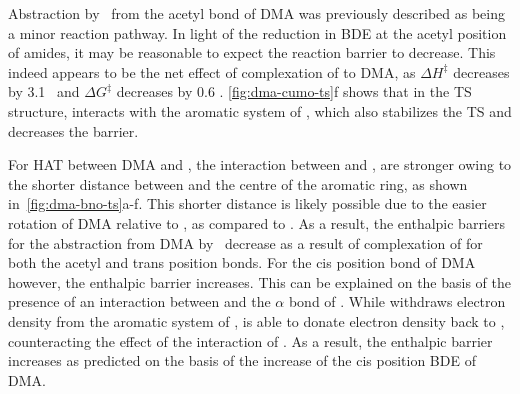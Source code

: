 Abstraction by \cumo\ from the acetyl  bond of DMA was previously
described as being a minor reaction pathway.\cite{Salamone2013} In light of the
reduction in BDE at the acetyl position of amides, it may be reasonable to
expect the reaction barrier to decrease. This indeed appears to be the net
effect of complexation of  to DMA, as $\Delta H^\ddagger$ decreases by
3.1 \kcalmol\ and $\Delta G^\ddagger$ decreases by 0.6 \kcalmol.
\ref{fig:dma-cumo-ts}f shows that in the TS structure,  interacts with
the aromatic system of \cumo, which also stabilizes the TS and decreases the
barrier.

For HAT between DMA and \bno, the interaction between  and \bno, are
stronger owing to the shorter distance between  and the centre of the
aromatic ring, as shown in~\ref{fig:dma-bno-ts}a-f. This shorter distance is
likely possible due to the easier rotation of DMA relative to \bno, as compared
to \cumo. As a result, the enthalpic barriers for the abstraction from DMA by
\bno\ decrease as a result of complexation of  for both the acetyl and
trans position  bonds. For the cis position  bond of DMA
however, the enthalpic barrier increases. This can be explained on the basis of
the presence of an interaction between  and the $\alpha$ bond
of \bno. While  withdraws electron density from the aromatic system of
\bno,  is able to donate electron density back to \bno, counteracting
the effect of the interaction of . As a result, the enthalpic barrier
increases as predicted on the basis of the increase of the cis position
 BDE of DMA.

